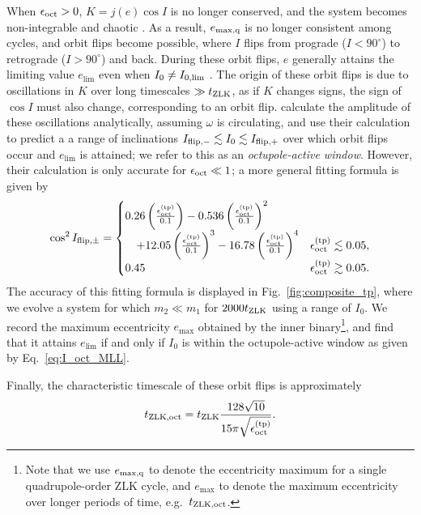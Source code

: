 \documentclass[
        fleqn,
        usenatbib,
    ]{mnras}
\newcommand*{\p}[1]{\left(#1\right)}
\begin{document}
When $\epsilon_{\rm oct} > 0$, $K = j(e) \cos I$ is no longer conserved, and the
system becomes non-integrable and chaotic \citep{ford2000secular, katz2011long,
lithwick2011eccentric}. As a result, $e_{\rm \max, q}$ is no longer consistent
among cycles, and orbit flips become possible, where $I$ flips from prograde ($I
< 90^\circ$) to retrograde ($I > 90^\circ$) and back. During these orbit flips,
$e$ generally attains the limiting value $e_{\lim}$ even when $I_{\rm 0} \neq
I_{\rm 0, \lim}$ \citep{lithwick2011eccentric, LML15}. The origin of these orbit
flips is due to oscillations in $K$ over long timescales $\gg t_{\rm ZLK}$, as
if $K$ changes signs, the sign of $\cos I$ must also change, corresponding to an
orbit flip. \citet{katz2011long} calculate the amplitude of these oscillations
analytically, assuming $\omega$ is circulating, and use their calculation to
predict a a range of inclinations $I_{\rm flip, -} \lesssim I_0 \lesssim I_{\rm
flip, +}$ over which orbit flips occur and $e_{\lim}$ is attained; we refer to
this as an \emph{octupole-active window}. However, their calculation is only
accurate for $\epsilon_{\rm oct} \ll 1$; a more general fitting formula is given
by \citep{MLL16}
\begin{equation}
    \cos^2 I_{\rm flip, \pm} = \begin{cases}
        0.26\p{\frac{\epsilon_{\rm oct}^{\rm(tp)}}{0.1}}
            - 0.536\p{\frac{\epsilon_{\rm oct}^{\rm(tp)}}{0.1}}^2\\
            \quad + 12.05\p{\frac{\epsilon_{\rm oct}^{\rm(tp)}}{0.1}}^3
            - 16.78\p{\frac{\epsilon_{\rm oct}^{\rm(tp)}}{0.1}}^4
            & \epsilon_{\rm oct}^{\rm(tp)} \lesssim 0.05,\\
        0.45 & \epsilon_{\rm oct}^{\rm(tp)} \gtrsim 0.05.
    \end{cases} \label{eq:I_oct_MLL}
\end{equation}
The accuracy of this fitting formula is displayed in
Fig.~\ref{fig:composite_tp}, where we evolve a system for which $m_2 \ll m_1$
for $2000t_{\rm ZLK}$ using a range of $I_0$. We record the maximum eccentricity
$e_{\max}$ obtained by the inner binary\footnote{Note that we use $e_{\rm \max,
q}$ to denote the eccentricity maximum for a single quadrupole-order ZLK cycle,
and $e_{\max}$ to denote the maximum eccentricity over longer periods of time,
e.g.\ $t_{\rm ZLK, oct}$.},
and find that it attains $e_{\lim}$ if and
only if $I_0$ is within the octupole-active window as given by
Eq.~\eqref{eq:I_oct_MLL}.

Finally, the characteristic timescale of these orbit flips is approximately
\citep{antognini2015timescales}
\begin{equation}
    t_{\rm ZLK, oct} = t_{\rm ZLK}\frac{128\sqrt{10}}{
        15\pi\sqrt{\epsilon_{\rm oct}^{\rm(tp)}}}.\label{eq:def_tzlkoct}
\end{equation}
\end{document}
